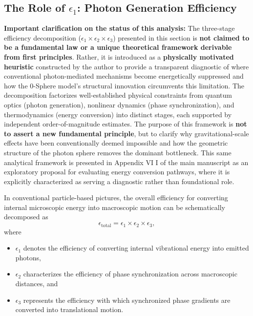 \documentclass[12pt,letterpaper]{article}
\begin{document}

\subsection{The Role of $\epsilon_1$: Photon Generation Efficiency}
\label{subsec:epsilon1}

\textbf{Important clarification on the status of this analysis:} The three-stage efficiency decomposition ($\epsilon_1 \times \epsilon_2 \times \epsilon_3$) presented in this section is \textbf{not claimed to be a fundamental law or a unique theoretical framework derivable from first principles}. Rather, it is introduced as a \textbf{physically motivated heuristic} constructed by the author to provide a transparent diagnostic of where conventional photon-mediated mechanisms become energetically suppressed and how the 0-Sphere model's structural innovation circumvents this limitation. The decomposition factorizes well-established physical constraints from quantum optics (photon generation), nonlinear dynamics (phase synchronization), and thermodynamics (energy conversion) into distinct stages, each supported by independent order-of-magnitude estimates. The purpose of this framework is \textbf{not to assert a new fundamental principle}, but to clarify why gravitational-scale effects have been conventionally deemed impossible and how the geometric structure of the photon sphere removes the dominant bottleneck. This same analytical framework is presented in Appendix VI I of the main manuscript \cite{Hanamura2026geometrical} as an exploratory proposal for evaluating energy conversion pathways, where it is explicitly characterized as serving a diagnostic rather than foundational role.

In conventional particle-based pictures, the overall efficiency for converting internal microscopic energy into macroscopic motion can be schematically decomposed as
\begin{equation}
\epsilon_\text{total} = \epsilon_1 \times \epsilon_2 \times \epsilon_3 ,
\end{equation}
where
\begin{itemize}
\item $\epsilon_1$ denotes the efficiency of converting internal vibrational energy into emitted photons,
\item $\epsilon_2$ characterizes the efficiency of phase synchronization across macroscopic distances, and
\item $\epsilon_3$ represents the efficiency with which synchronized phase gradients are converted into translational motion.
\end{itemize}
\end{document}
